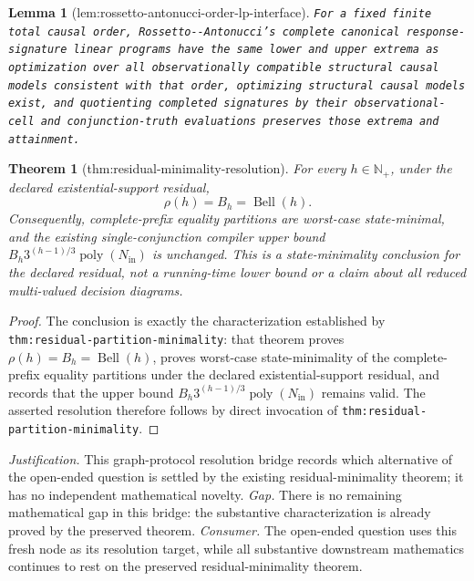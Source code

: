 \documentclass{article}
\newtheorem{theorem}{Theorem}
\newtheorem{lemma}{Lemma}
\begin{document}
\begin{lemma}[lem:rossetto-antonucci-order-lp-interface]\label{lem:rossetto-antonucci-order-lp-interface}
\texttt{For a fixed finite total causal order,\allowbreak{} Rossetto-\allowbreak{}-\allowbreak{}Antonucci's complete canonical response-\allowbreak{}signature linear programs have the same lower and upper extrema as optimization over all observationally compatible structural causal models consistent with that order,\allowbreak{} optimizing structural causal models exist,\allowbreak{} and quotienting completed signatures by their observational-\allowbreak{}cell and conjunction-\allowbreak{}truth evaluations preserves those extrema and attainment.}
\end{lemma}

\begin{theorem}[thm:residual-minimality-resolution]\label{thm:residual-minimality-resolution}
For every \(h\in\mathbb N_{+}\), under the declared existential-support residual,
\[
\rho(h)=B_h=\operatorname{Bell}(h).
\]
Consequently, complete-prefix equality partitions are worst-case state-minimal, and the existing single-conjunction compiler upper bound \(B_h3^{(h-1)/3}\operatorname{poly}(N_{\mathrm{in}})\) is unchanged. This is a state-minimality conclusion for the declared residual, not a running-time lower bound or a claim about all reduced multi-valued decision diagrams.
\end{theorem}
\begin{proof}
The conclusion is exactly the characterization established by \texttt{thm:residual-partition-minimality}: that theorem proves \(\rho(h)=B_h=\operatorname{Bell}(h)\), proves worst-case state-minimality of the complete-prefix equality partitions under the declared existential-support residual, and records that the upper bound \(B_h3^{(h-1)/3}\operatorname{poly}(N_{\mathrm{in}})\) remains valid. The asserted resolution therefore follows by direct invocation of \texttt{thm:residual-partition-minimality}.
\end{proof}
\par\smallskip\noindent \textit{Justification.} This graph-protocol resolution bridge records which alternative of the open-ended question is settled by the existing residual-minimality theorem; it has no independent mathematical novelty. \textit{Gap.} There is no remaining mathematical gap in this bridge: the substantive characterization is already proved by the preserved theorem. \textit{Consumer.} The open-ended question uses this fresh node as its resolution target, while all substantive downstream mathematics continues to rest on the preserved residual-minimality theorem.
\end{document}
